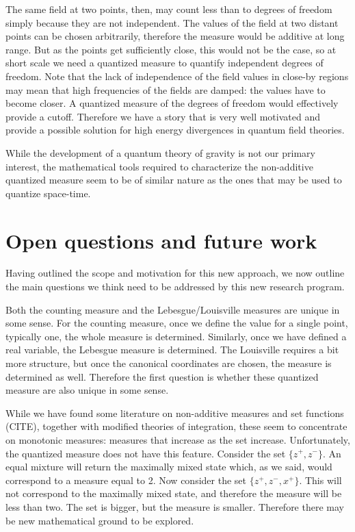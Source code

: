 \documentclass[10pt,twocolumn, nofootinbib]{revtex4-2}
\begin{document}
The same field at two points, then, may count less than to degrees of freedom simply because they are not independent. The values of the field at two distant points can be chosen arbitrarily, therefore the measure would be additive at long range. But as the points get sufficiently close, this would not be the case, so at short scale we need a quantized measure to quantify independent degrees of freedom. Note that the lack of independence of the field values in close-by regions may mean that high frequencies of the fields are damped: the values have to become closer. A quantized measure of the degrees of freedom would effectively provide a cutoff. Therefore we have a story that is very well motivated and provide a possible solution for high energy divergences in quantum field theories.

While the development of a quantum theory of gravity is not our primary interest, the mathematical tools required to characterize the non-additive quantized measure seem to be of similar nature as the ones that may be used to quantize space-time.

\section{Open questions and future work}

Having outlined the scope and motivation for this new approach, we now outline the main questions we think need to be addressed by this new research program.

Both the counting measure and the Lebesgue/Louisville measures are unique in some sense. For the counting measure, once we define the value for a single point, typically one, the whole measure is determined. Similarly, once we have defined a real variable, the Lebesgue measure is determined. The Louisville requires a bit more structure, but once the canonical coordinates are chosen, the measure is determined as well. Therefore the first question is whether these quantized measure are also unique in some sense.

While we have found some literature on non-additive measures and set functions (CITE), together with modified theories of integration, these seem to concentrate on monotonic measures: measures that increase as the set increase. Unfortunately, the quantized measure does not have this feature. Consider the set $\{ z^+, z^- \}$. An equal mixture will return the maximally mixed state which, as we said, would correspond to a measure equal to 2. Now consider the set $\{ z^+, z^-, x^+ \}$. This will not correspond to the maximally mixed state, and therefore the measure will be less than two. The set is bigger, but the measure is smaller. Therefore there may be new mathematical ground to be explored.
\end{document}
